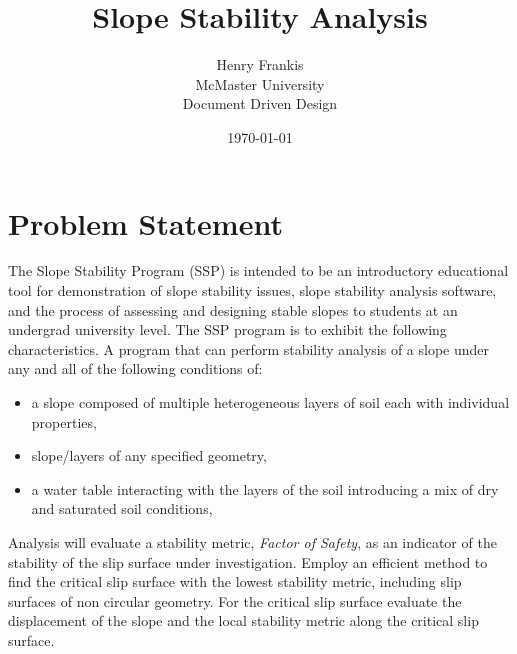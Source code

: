 \documentclass[12pt]{article}
\begin{document}
\title{Slope Stability Analysis}
\author{Henry Frankis\\ McMaster University\\ Document Driven Design}
\date{\today}
\maketitle

\section*{Problem Statement}

\begin{par} \indent \indent

The Slope Stability Program (SSP) is intended to be
an introductory educational tool for demonstration
of slope stability issues, slope stability analysis 
software, and the process of assessing and
designing stable slopes to students at an undergrad
university level. The SSP program is to exhibit the following
characteristics.  A program that can perform stability
analysis of a slope under any and all of the
following conditions of:

\begin{itemize}
\item {a slope composed of multiple heterogeneous layers of soil each with individual properties,}
\item {slope/layers of any specified geometry,}
\item {a water table interacting with the layers of the soil introducing a mix of dry and saturated soil conditions,}
\end{itemize}

Analysis will evaluate a stability metric, \textit{Factor of Safety},
as an indicator of the stability of the slip surface under
investigation. Employ an efficient method to find the critical slip
surface with the lowest stability metric, including slip surfaces
of non circular geometry. For the critical slip surface evaluate 
the displacement of the slope and the local stability
metric along the critical slip surface.

\end{par}

\end{document}
